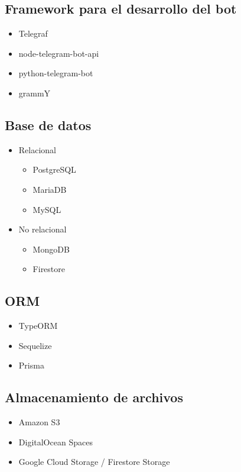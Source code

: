 \subsection{Framework para el desarrollo del bot}
\begin{itemize}
    \item Telegraf
    \item node-telegram-bot-api
    \item python-telegram-bot
    \item grammY
\end{itemize}

\subsection{Base de datos}
\begin{itemize}
    \item Relacional
    \begin{itemize}
        \item PostgreSQL
        \item MariaDB
        \item MySQL
    \end{itemize}
    \item No relacional
    \begin{itemize}
        \item MongoDB
        \item Firestore
    \end{itemize}
\end{itemize}

\subsection{ORM}
\begin{itemize}
    \item TypeORM
    \item Sequelize
    \item Prisma
\end{itemize}

\subsection{Almacenamiento de archivos}
\begin{itemize}
    \item Amazon S3
    \item DigitalOcean Spaces
    \item Google Cloud Storage / Firestore Storage
\end{itemize}

